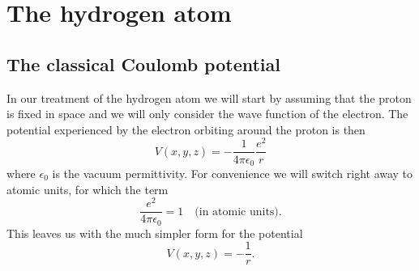 \documentclass[../Main/chem331-notes.tex]{subfiles}
\begin{document}
\setcounter{section}{12}

\section{The hydrogen atom}
\subsection{The classical Coulomb potential}
In our treatment of the hydrogen atom we will start by assuming that the proton is fixed in space and we will only consider the wave function of the electron. The potential experienced by the electron orbiting around the proton is then
\begin{equation}
V(x,y,z) = - \frac{1}{4 \pi \epsilon_0} \frac{e^2}{r}
\end{equation}
where $\epsilon_0$ is the vacuum permittivity.
For convenience we will switch right away to atomic units, for which the term
\begin{equation}
\frac{e^2}{4 \pi \epsilon_0} = 1 \quad \text{(in atomic units)}.
\end{equation}
This leaves us with the much simpler form for the potential
\begin{equation}
V(x,y,z) = - \frac{1}{r}.
\end{equation}
\end{document}
